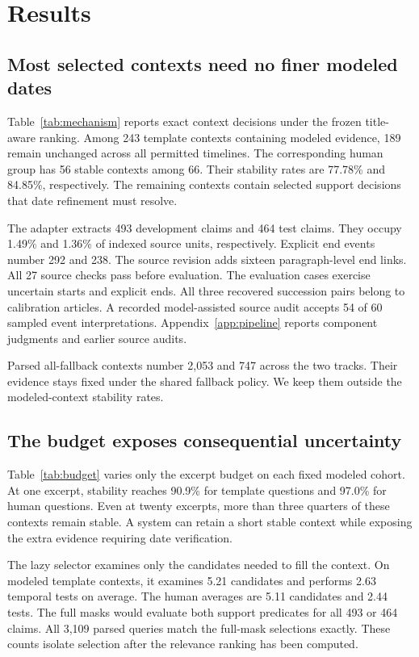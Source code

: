 \section{Results}
\label{sec:results}

\subsection{Most selected contexts need no finer modeled dates}

Table~\ref{tab:mechanism} reports exact context decisions under the frozen title-aware ranking.
Among 243 template contexts containing modeled evidence, 189 remain unchanged across all permitted timelines.
The corresponding human group has 56 stable contexts among 66.
Their stability rates are 77.78\% and 84.85\%, respectively.
The remaining contexts contain selected support decisions that date refinement must resolve.


The adapter extracts 493 development claims and 464 test claims.
They occupy 1.49\% and 1.36\% of indexed source units, respectively.
Explicit end events number 292 and 238.
The source revision adds sixteen paragraph-level end links.
All 27 source checks pass before evaluation.
The evaluation cases exercise uncertain starts and explicit ends.
All three recovered succession pairs belong to calibration articles.
A recorded model-assisted source audit accepts 54 of 60 sampled event interpretations.
Appendix~\ref{app:pipeline} reports component judgments and earlier source audits.

Parsed all-fallback contexts number 2,053 and 747 across the two tracks.
Their evidence stays fixed under the shared fallback policy.
We keep them outside the modeled-context stability rates.

\subsection{The budget exposes consequential uncertainty}

Table~\ref{tab:budget} varies only the excerpt budget on each fixed modeled cohort.
At one excerpt, stability reaches 90.9\% for template questions and 97.0\% for human questions.
Even at twenty excerpts, more than three quarters of these contexts remain stable.
A system can retain a short stable context while exposing the extra evidence requiring date verification.


The lazy selector examines only the candidates needed to fill the context.
On modeled template contexts, it examines 5.21 candidates and performs 2.63 temporal tests on average.
The human averages are 5.11 candidates and 2.44 tests.
The full masks would evaluate both support predicates for all 493 or 464 claims.
All 3,109 parsed queries match the full-mask selections exactly.
These counts isolate selection after the relevance ranking has been computed.

